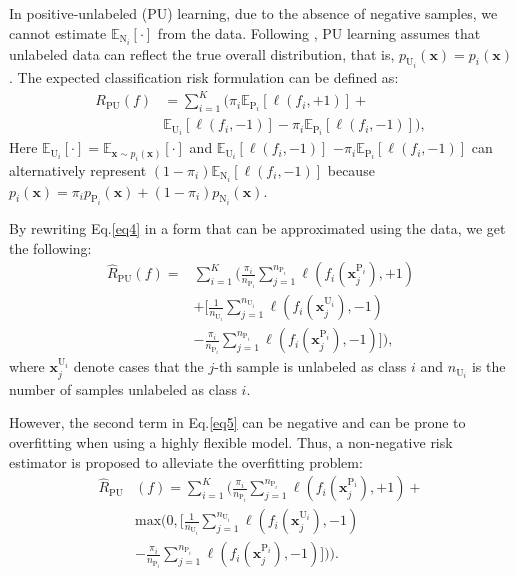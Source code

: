 \documentclass[11pt]{article}
\begin{document}
In positive-unlabeled (PU) learning, due to the absence of negative samples, we cannot  estimate $\mathbb{E}_{\mathrm{N}_{i}}[\cdot]$ from the data. Following \citep{NIPS2014_35051070}, PU learning assumes that unlabeled data can reflect the true overall distribution, that is, $p_{\mathrm{U}_{i}}(\boldsymbol{x})=p_{i}(\boldsymbol{x})$. The expected classification risk formulation can be defined as:
\begin{equation}
\begin{aligned}\label{eq4}
R_{\mathrm{PU}}(f)&=\sum_{i=1}^{K}(\pi_{i} \mathbb{E}_{\mathrm{P}_{i}}[\ell(f_{i}, +1)]+\\&\mathbb{E}_{\mathrm{U}_{i}}[\ell(f_{i}, -1)]-\pi_{i} \mathbb{E}_{\mathrm{P}_{i}}[\ell(f_{i}, -1)]),
\end{aligned}
\end{equation}
Here $\mathbb{E}_{\mathrm{U}_{i}}[\cdot]=\mathbb{E}_{\boldsymbol{x} \sim p_{i}(\boldsymbol{x})}[\cdot]$ and $\mathbb{E}_{\mathrm{U}_{i}}[\ell(f_{i}, -1)]$ $-\pi_{i} \mathbb{E}_{\mathrm{P}_{i}}[\ell(f_{i}, -1)]$ can alternatively represent $(1-\pi_{i})\mathbb{E}_{\mathrm{N}_{i}}[\ell(f_{i}, -1)]$ because $p_{i}(\boldsymbol{x})=
\pi_{i}p_{\mathrm{P}_{i}}(\boldsymbol{x})+(1-\pi_{i})p_{\mathrm{N}_{i}}(\boldsymbol{x})$.

By rewriting Eq.\ref{eq4} in a form that can be approximated using the data, we get the following:
\begin{equation}
\begin{aligned}\label{eq5}
\widehat{R}_{\mathrm{PU}}(f)=&\sum_{i=1}^{K}(\frac{\pi_{i}}{n_{\mathrm{P}_{i}}} \sum_{j=1}^{n_{\mathrm{P}_{i}}} \ell(f_{i}( \boldsymbol{x}_{j}^{\mathrm{P}_{i}}), +1) \\
&+[\frac{1}{n_{\mathrm{U}_{i}}} \sum_{j=1}^{n_{\mathrm{U}_{i}}} \ell(f_{i}( \boldsymbol{x}_{j}^{\mathrm{U}_{i}}), -1)\\&-\frac{\pi_{i}}{n_{\mathrm{P}_{i}}} \sum_{j=1}^{n_{\mathrm{P}_{i}}} \ell(f_{i}( \boldsymbol{x}_{j}^{\mathrm{P}_{i}}), -1)]),
\end{aligned}
\end{equation}
where $\boldsymbol{x}_{j}^{\mathrm{U}_{i}}$ denote cases that the $j$-th sample is unlabeled as class $i$ and $n_{\mathrm{U}_{i}}$ is the number of samples unlabeled as class $i$.

However, the second term in Eq.\ref{eq5} can be negative and can be prone to overfitting when using a highly flexible model. Thus, a non-negative risk estimator \citep{NIPS2017_7cce53cf} is proposed to alleviate the overfitting problem:
\begin{equation}
\begin{aligned}\label{eq7}
\widehat{R}_{\mathrm{PU}}&(f)=\sum_{i=1}^{K}(\frac{\pi_{i}}{n_{\mathrm{P}_{i}}} \sum_{j=1}^{n_{\mathrm{P}_{i}}} \ell(f_{i}( \boldsymbol{x}_{j}^{\mathrm{P}_{i}}), +1)+ \\
&\mathrm{max}(0,[\frac{1}{n_{\mathrm{U}_{i}}} \sum_{j=1}^{n_{\mathrm{U}_{i}}} \ell(f_{i}( \boldsymbol{x}_{j}^{\mathrm{U}_{i}}), -1)\\&-\frac{\pi_{i}}{n_{\mathrm{P}_{i}}} \sum_{j=1}^{n_{\mathrm{P}_{i}}} \ell(f_{i}( \boldsymbol{x}_{j}^{\mathrm{P}_{i}}), -1)])).
\end{aligned}
\end{equation}
\end{document}
